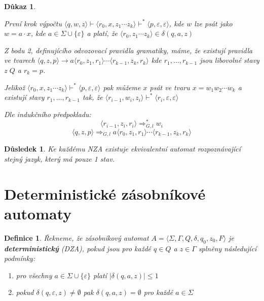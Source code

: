 \documentclass[10pt, a4paper, titlepage]{article}
\theoremstyle{note}
\newtheorem{dukaz}{Důkaz}
\newtheorem{definice}{Definice}
\newtheorem{dusledek}{Důsledek}
\begin{document}
\begin{dukaz}
\begin{itemize}
První krok výpočtu $\langle q,w,z \rangle \vdash \langle r_0,x,z_1 \cdots z_k \rangle \vdash^* \langle p,\varepsilon,\varepsilon \rangle$, kde $w$ lze psát jako $w=a\cdot x$, kde $a \in \Sigma \cup \lbrace \varepsilon \rbrace$ a platí, že $\langle r_0,z_1 \cdots z_k \rangle \in \delta (q,a,z)$

Z bodu 2, definujícího odvozovací pravidla gramatiky, máme, že existují pravidla ve tvarech $\langle q,z,p \rangle \rightarrow a \langle r_0,z_1,r_1 \rangle \cdots \langle r_{k-1},z_k,r_k \rangle$ kde $r_1,\ldots,r_{k-1}$ jsou libovolné stavy z $Q$ a $r_k=p$.

Jelikož $\langle r_0,x,z_1\cdots z_k \rangle \vdash^* \langle p,\varepsilon,\varepsilon \rangle$ pak můžeme $x$ psát ve tvaru $x=w_1w_2\cdots w_k$ a existují stavy $r_1,\ldots,r_{k-1}$ tak, že $\langle r_{i-1},w_i,z_i \rangle \vdash^* \langle r_i,\varepsilon,\varepsilon \rangle$

Dle indukčního předpokladu:
$$
\langle r_{i-1},z_i,r_i \rangle \Rightarrow_{G,l}^* w_i
$$$$
\langle q,z,p \rangle \Rightarrow_{G,l} a \langle r_0,z_1,r_1 \rangle \cdots \langle r_{k-1},z_k,r_k \rangle
$$
\end{itemize}
\end{dukaz}

\begin{dusledek}
Ke každému NZA existuje ekvivalentní automat rozpoznávající stejný jazyk, který má pouze 1 stav.
\end{dusledek}

\section{Deterministické zásobníkové automaty}

\begin{definice}
Řekneme, že zásobníkový automat $A = \langle \Sigma,\Gamma,Q,\delta,q_0,z_0,F \rangle$ je \textbf{deterministický} (DZA), pokud jsou pro každé $q \in Q$ a $z \in \Gamma$ splněny následující podmínky:
\begin{enumerate}
\item
pro všechny $a \in \Sigma \cup \lbrace \varepsilon \rbrace$ platí $|\delta (q,a,z)| \le 1$
\item
pokud $\delta (q,\varepsilon,z) \neq \emptyset$ pak $\delta (q,a,z) = \emptyset$ pro každé $a \in \Sigma$
\end{enumerate}
\end{definice}
\end{document}
